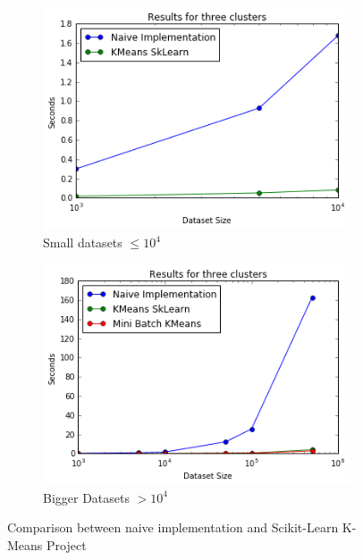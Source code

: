 \documentclass[11pt]{article}
\begin{document}
\begin{figure}[h!]
	\centering 
	\begin{subfigure}{0.48\textwidth}
		\includegraphics[width=\textwidth]{Figures/Comparison2.png}
		\caption{Small datasets $\leq 10^4$}
	\end{subfigure}
	\quad
	\begin{subfigure}{0.48\textwidth}
		\includegraphics[width=\textwidth]{Figures/Comparison.png}
		\caption{Bigger Datasets  $> 10^4$}
	\end{subfigure} 
	\caption{Comparison between naive implementation and Scikit-Learn K-Means Project}
	\label{comp}
\end{figure}

	
\end{document}
